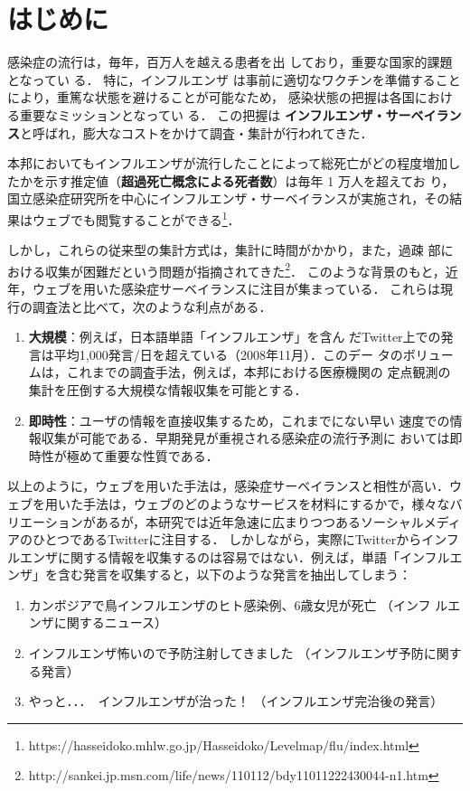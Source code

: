 \documentclass[japanese]{jnlp_1.4}
\begin{document}
\maketitle


\section{はじめに}

感染症の流行は，毎年，百万人を越える患者を出
しており，重要な国家的課題となってい
る\cite{国立感染症研究所2006}．
特に，インフルエンザ
は事前に適切なワクチンを準備することにより，重篤な状態を避けることが可能なため，
感染状態の把握は各国における重要なミッションとなってい
る\cite{Ferguson2005}．
この把握は\textbf{ インフルエンザ・サーベイランス}と呼ばれ，膨大なコストをかけて調査・集計が行われてきた．

本邦においてもインフルエンザが流行したことによって総死亡がどの程度増加したかを示す推定値（{\bf 超過死亡概念による死者数}）は毎年 1 万人を超えてお
り\cite{大日2003}，国立感染症研究所を中心にインフルエンザ・サーベイランスが実施され，その結果はウェブでも閲覧することができる\footnote{https://hasseidoko.mhlw.go.jp/Hasseidoko/Levelmap/flu/index.html}．

しかし，これらの従来型の集計方式は，集計に時間がかかり，また，過疎
部における収集が困難だという問題が指摘されてきた\footnote{http://sankei.jp.msn.com/life/news/110112/bdy11011222430044-n1.htm}．
このような背景のもと，近年，ウェブを用いた感染症サーベイランスに注目が集まっている．
これらは現行の調査法と比べて，次のような利点がある．

\begin{enumerate}
\item {\bf 大規模}：例えば，日本語単語「インフルエンザ」を含ん
  だTwitter上での発言は平均1,000発言/日を超えている（2008年11月）．このデー
  タのボリュームは，これまでの調査手法，例えば，本邦における医療機関の
  定点観測の集計を圧倒する大規模な情報収集を可能とする．
\item {\bf 即時性}：ユーザの情報を直接収集するため，これまでにない早い
  速度での情報収集が可能である．早期発見が重視される感染症の流行予測に
  おいては即時性が極めて重要な性質である．
\end{enumerate}

以上のように，ウェブを用いた手法は，感染症サーベイランスと相性が高い．ウェブを用いた手法は，ウェブのどのようなサービスを材料にするかで，様々なバリエーションがあるが，本研究では近年急速に広まりつつあるソーシャルメディアのひとつであるTwitterに注目する．
しかしながら，実際にTwitterからインフルエンザに関する情報を収集するのは容易ではない．例えば，単語「インフルエンザ」を含む発言を収集すると，以下のような発言を抽出してしまう：
\begin{enumerate}
\item カンボジアで鳥インフルエンザのヒト感染例、6歳女児が死亡 （インフ
  ルエンザに関するニュース）
\item インフルエンザ怖いので予防注射してきました （インフルエンザ予防に関する発言）
\item  やっと．．．　インフルエンザが治った！ （インフルエンザ完治後の発言）
\end{enumerate}
\end{document}
